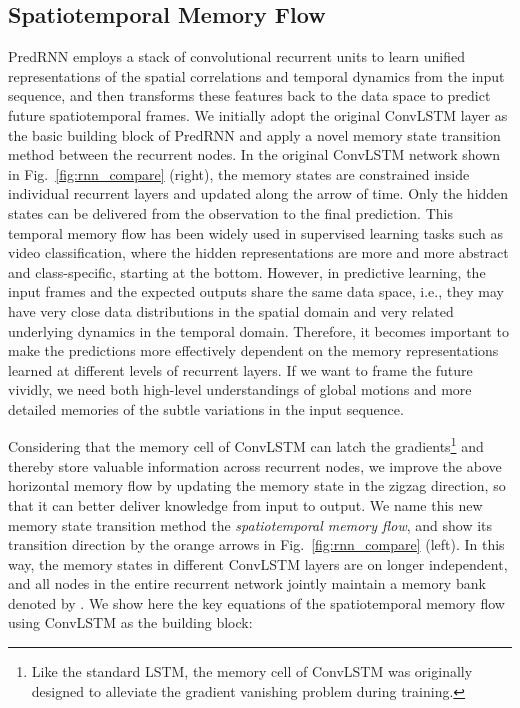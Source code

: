 \documentclass[10pt,journal,compsoc]{IEEEtran}
\newcommand{\fig}[1]{Fig.~\ref{#1}}
\begin{document}
\subsection{Spatiotemporal Memory Flow}

PredRNN employs a stack of convolutional recurrent units to learn unified representations of the spatial correlations and temporal dynamics from the input sequence, and then transforms these features back to the data space to predict future spatiotemporal frames. 
We initially adopt the original ConvLSTM layer as the basic building block of PredRNN and apply a novel memory state transition method between the recurrent nodes.
In the original ConvLSTM network \cite{shi2015convolutional} shown in \fig{fig:rnn_compare} (right), the memory states  are constrained inside individual recurrent layers and updated along the arrow of time. 
Only the hidden states  can be delivered from the observation to the final prediction.
This temporal memory flow has been widely used in supervised learning tasks such as video classification, where the hidden representations are more and more abstract and class-specific, starting at the bottom.
However, in predictive learning, the input frames and the expected outputs share the same data space, i.e., they may have very close data distributions in the spatial domain and very related underlying dynamics in the temporal domain.
Therefore, it becomes important to make the predictions more effectively dependent on the memory representations learned at different levels of recurrent layers. 
If we want to frame the future vividly, we need both high-level understandings of global motions and more detailed memories of the subtle variations in the input sequence. 


Considering that the memory cell of ConvLSTM can latch the gradients\footnote{Like the standard LSTM, the memory cell of ConvLSTM was originally designed to alleviate the gradient vanishing problem during training.} and thereby store valuable information across recurrent nodes, we improve the above horizontal memory flow by updating the memory state in the zigzag direction, so that it can better deliver knowledge from input to output. 
We name this new memory state transition method the \textit{spatiotemporal memory flow}, and show its transition direction by the orange arrows in \fig{fig:rnn_compare} (left).
In this way, the memory states in different ConvLSTM layers are on longer independent, and all nodes in the entire recurrent network jointly maintain a memory bank denoted by . We show here the key equations of the spatiotemporal memory flow using ConvLSTM as the building block:
\end{document}
